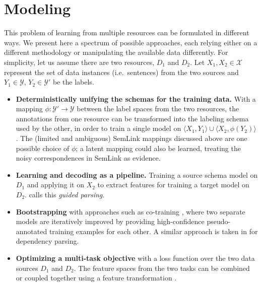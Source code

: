\documentclass[11pt]{article}
\begin{document}
\section{Modeling}\label{sec:modeling}
This problem of learning from multiple resources can be formulated in different ways. We present here a spectrum of possible approaches, each relying either on a different methodology or manipulating the available data differently. For simplicity, let us assume there are two resources, $D_1$ and $D_2$. Let $X_1, X_2 \in \mathcal{X}$ represent the set of data instances (i.e.~sentences) from the two sources and $Y_1 \in \mathcal{Y}$, $Y_2 \in \mathcal{Y}'$ be the labels.
\begin{itemize}
\item \textbf{Deterministically unifying the schemas for the training data.} With a mapping $\phi : \mathcal{Y}' \rightarrow \mathcal{Y}$ between the label spaces from the two resources, the annotations from one resource can be transformed into the labeling schema used by the other, in order to train a single model 
on $\langle X_1, Y_1\rangle \cup \langle X_2, \phi(Y_2)\rangle$. The (limited and ambiguous) SemLink mappings discussed above are one possible choice of $\phi$; 
a latent mapping could also be learned, treating the noisy correspondences in SemLink as evidence.
\item \textbf{Learning and decoding as a pipeline.} Training a source schema model on $D_1$ and applying it on $X_2$ to extract features for training a target model on $D_2$. 
 calls this \emph{guided parsing}. 
\item \textbf{Bootstrapping} with approaches such as co-training \citep{blum-98,clark03}, where two separate models are iteratively improved by 
providing high-confidence pseudo-annotated training examples for each other. A similar approach is taken in \citet{zhou:2013} for dependency parsing.
\item \textbf{Optimizing a multi-task objective} with a loss function over the two data sources $D_1$ and $D_2$. 
The feature spaces from the two tasks can be combined \citep{daume-07,johansson-13} or coupled together using a feature transformation \citep{mtfl,scl}.
\end{itemize}
\end{document}
